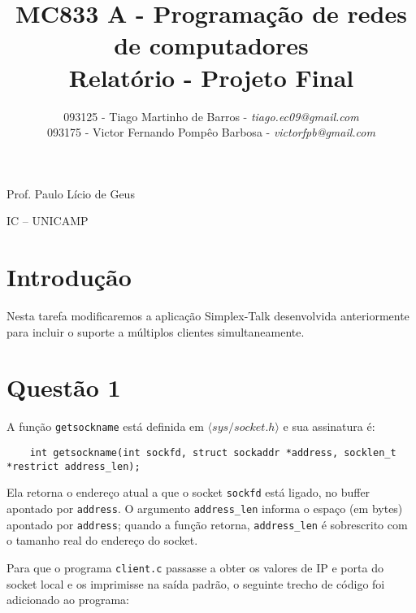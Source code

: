 \documentclass[a4paper,10pt]{article}
\begin{document}


\title{MC833 A - Programação de redes de computadores\\
Relatório - Projeto Final}

\author {   093125 - Tiago Martinho de Barros - \textit{tiago.ec09@gmail.com}\\
            093175 - Victor Fernando Pompêo Barbosa - \textit{victorfpb@gmail.com}}


\maketitle

\centerline{Prof. Paulo Lício de Geus}
\centerline{IC -- UNICAMP}

\vspace{2cm}
\tableofcontents
    
\newpage
\section{Introdução}
\hspace{14pt}

    Nesta tarefa modificaremos a aplicação Simplex-Talk desenvolvida anteriormente para incluir o suporte a múltiplos clientes simultaneamente.

\section{Questão 1}
A função {\tt getsockname} está definida em $\langle sys/socket.h \rangle$ e sua assinatura é:
    \begin{lstlisting}
    int getsockname(int sockfd, struct sockaddr *address, socklen_t *restrict address_len);
    \end{lstlisting}

Ela retorna o endereço atual a que o socket {\tt sockfd} está ligado, no buffer apontado por {\tt address}. O argumento {\tt address\_len} informa o espaço (em bytes) apontado por {\tt address}; quando a função retorna, {\tt address\_len} é sobrescrito com o tamanho real do endereço do socket.

Para que o programa {\tt client.c} passasse a obter os valores de IP e porta do socket local e os imprimisse na saída padrão, o seguinte trecho de código foi adicionado ao programa:
\end{document}
